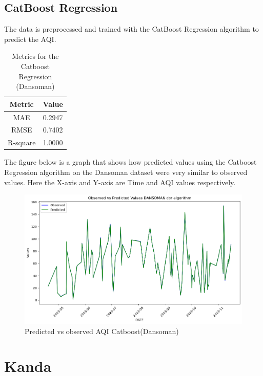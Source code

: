 \documentclass{book}
\numberwithin{equation}{section}
\numberwithin{figure}{section}
\begin{document}
\subsection{CatBoost Regression} 
The data is preprocessed and trained with the CatBoost Regression algorithm to predict the AQI.
\begin{table}[H]
    \centering
    \begin{tabular}{|c|c|}
        \hline
        \textbf{Metric} & \textbf{Value} \\
        \hline
        MAE & 0.2947 \\
        \hline
        RMSE & 0.7402\\
        \hline
        R-square & 1.0000 \\
        \hline
    \end{tabular}
    
    \caption{Metrics for the Catboost Regression (Dansoman)}
    \label{tab: CBR metrics(Dansoman)}
\end{table}
The figure below is a graph that shows how predicted values using the Catboost Regression algorithm on the Dansoman dataset were very similar to observed values. Here the X-axis and Y-axis are Time and AQI values respectively.
\begin{figure}[H]
 \centering
        \includegraphics[width=\linewidth]{dansoman cbr.png}
       
        \caption{ Predicted vs observed AQI Catboost(Dansoman)}
        \label{fig: CBR Predicted vs observed AQI(Dansoman)}
\end{figure}   

\section{Kanda}
\label{kanda}
\end{document}
